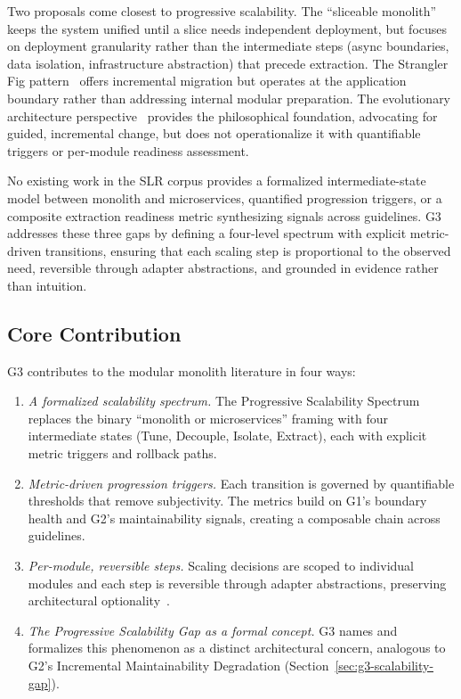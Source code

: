 Two proposals come closest to progressive scalability. The ``sliceable monolith''~\cite{montesi2021sliceable} keeps the system unified until a slice needs independent deployment, but focuses on deployment granularity rather than the intermediate steps (async boundaries, data isolation, infrastructure abstraction) that precede extraction. The Strangler Fig pattern~\cite{stranglerPatterns,newman2019monolith} offers incremental migration but operates at the application boundary rather than addressing internal modular preparation. The evolutionary architecture perspective~\cite{FordParsons2017} provides the philosophical foundation, advocating for guided, incremental change, but does not operationalize it with quantifiable triggers or per-module readiness assessment.

No existing work in the SLR corpus provides a formalized intermediate-state model between monolith and microservices, quantified progression triggers, or a composite extraction readiness metric synthesizing signals across guidelines. G3 addresses these three gaps by defining a four-level spectrum with explicit metric-driven transitions, ensuring that each scaling step is proportional to the observed need, reversible through adapter abstractions, and grounded in evidence rather than intuition.

\subsection*{Core Contribution}

G3 contributes to the modular monolith literature in four ways:

\begin{enumerate}[itemsep=8pt,topsep=2pt]
  \item \emph{A formalized scalability spectrum.} The Progressive Scalability Spectrum replaces the binary ``monolith or microservices'' framing with four intermediate states (Tune, Decouple, Isolate, Extract), each with explicit metric triggers and rollback paths.

  \item \emph{Metric-driven progression triggers.} Each transition is governed by quantifiable thresholds that remove subjectivity. The metrics build on G1's boundary health and G2's maintainability signals, creating a composable chain across guidelines.

  \item \emph{Per-module, reversible steps.} Scaling decisions are scoped to individual modules and each step is reversible through adapter abstractions, preserving architectural optionality~\cite{gravanis2021dont, segment2023}.

  \item \emph{The Progressive Scalability Gap as a formal concept.} G3 names and formalizes this phenomenon as a distinct architectural concern, analogous to G2's Incremental Maintainability Degradation (Section~\ref{sec:g3-scalability-gap}).
\end{enumerate}


